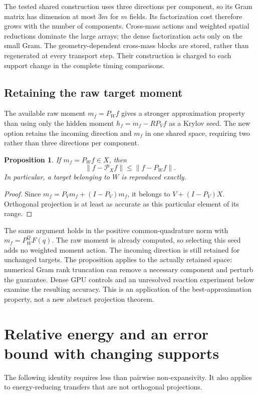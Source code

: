\documentclass[10pt,a4paper]{article}
\newtheorem{proposition}{Proposition}
\begin{document}
The tested shared construction uses three directions per component,
so its Gram matrix has dimension at most $3m$ for $m$ fields. Its
factorization cost therefore grows with the number of components.
Cross-mass actions and weighted spatial reductions dominate the large
arrays; the dense factorization acts only on the small Gram. The
geometry-dependent cross-mass blocks are stored, rather than regenerated
at every transport step. Their construction is charged to each support
change in the complete timing comparisons.

\subsection{Retaining the raw target moment}
The available raw moment $m_f=P_Wf$ gives a stronger approximation
property than using only the hidden moment $h_f=m_f-RP_Vf$ as a Krylov
seed. The new option retains the incoming direction and $m_f$ in one
shared space, requiring two rather than three directions per component.

\begin{proposition}\label{prop:target-seed}
If $m_f=P_Wf\in X$, then
\[
 \|f-\mathcal P_Xf\|\leq\|f-P_Wf\|.
\]
In particular, a target belonging to $W$ is reproduced exactly.
\end{proposition}
\begin{proof}
Since $m_f=P_Vm_f+(I-P_V)m_f$, it belongs to
$V+(I-P_V)X$. Orthogonal projection is at least as accurate as this
particular element of its range.
\end{proof}
The same argument holds in the positive common-quadrature norm with
$m_f=P_W^QF(q)$. The raw moment is already computed, so selecting this
seed adds no weighted moment action. The incoming direction is still
retained for unchanged targets. The proposition applies to the actually
retained space: numerical Gram rank truncation can remove a necessary
component and perturb the guarantee. Dense GPU controls and an unresolved
reaction experiment below examine the resulting accuracy. This is an
application of the best-approximation property, not a new abstract
projection theorem.

\section{Relative energy and an error bound with changing supports}
The following identity requires less than pairwise non-expansivity.
It also applies to energy-reducing transfers that are not orthogonal
projections.
\end{document}
